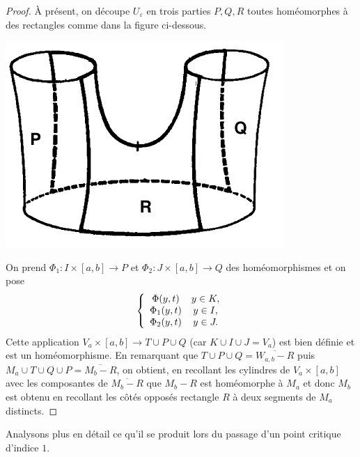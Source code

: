 \begin{proof}
    À présent, on découpe $U_\varepsilon$ en trois parties $P,Q,R$ toutes homéomorphes à des 
    rectangles comme dans la figure ci-dessous. 
    \begin{center}
        \includegraphics{figures/scan/decoup.png}
    \end{center}
    On prend $\Phi_1 :I\times[a,b]\to P$ et $\Phi_2:J\times[a,b]\to Q$ des homéomorphismes et 
    on pose 
    \[
        \left\lbrace\begin{array}{c c } 
            \Phi(y,t) &y\in K,\\ 
            \Phi_1(y,t) & y\in I,\\ 
            \Phi_2(y,t) & y\in J.
        \end{array}\right.
    \]
    Cette application $V_a\times [a,b]\to T\cup P\cup Q$ (car $K\cup I\cup J= V_a$) est bien 
    définie et est un homéomorphisme. 
    En remarquant que $T\cup P\cup Q=\overline{W_{a,b}-R}$ puis 
    $M_a\cup T\cup Q\cup P=\overline{M_b-R}$, on obtient, en recollant les cylindres de 
    $V_a\times[a,b]$ avec les composantes de $\overline{M_b-R}$ que $M_b-R$ est homéomorphe 
    à $M_a$ et donc $M_b$ est obtenu en recollant les côtés opposés rectangle $R$ à deux 
    segments de $M_a$ distincts.
\end{proof}

Analysons plus en détail ce qu'il se produit lors du passage d'un point critique d'indice $1$. 

